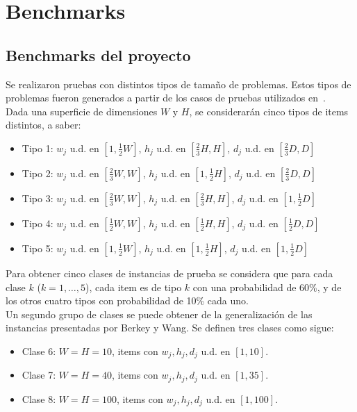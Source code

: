 \section{Benchmarks\label{sec:benchmark}}

\subsection{Benchmarks del proyecto}

Se realizaron pruebas con distintos tipos de tamaño de problemas. Estos tipos de problemas fueron generados a partir de los casos de pruebas utilizados en~\cite{bib:martello00threedimensional}. \\

Dada una superficie de dimensiones $W$ y $H$, se considerarán cinco tipos de items distintos, a saber:

\begin{itemize}
 \item Tipo 1: $w_j$ u.d. en $[1, \frac{1}{2}W]$, $h_j$ u.d. en $[\frac{2}{3}H, H]$, $d_j$ u.d. en $[\frac{2}{3}D, D]$
 \item Tipo 2: $w_j$ u.d. en $[\frac{2}{3}W, W]$, $h_j$ u.d. en $[1, \frac{1}{2}H]$, $d_j$ u.d. en $[\frac{2}{3}D, D]$
 \item Tipo 3: $w_j$ u.d. en $[\frac{2}{3}W, W]$, $h_j$ u.d. en $[\frac{2}{3}H,H]$, $d_j$ u.d. en $[1, \frac{1}{2}D]$
 \item Tipo 4: $w_j$ u.d. en $[\frac{1}{2}W, W]$, $h_j$ u.d. en $[\frac{1}{2}H,H]$, $d_j$ u.d. en $[\frac{1}{2}D,D]$
 \item Tipo 5: $w_j$ u.d. en $[1,\frac{1}{2}W]$, $h_j$ u.d. en $[1,\frac{1}{2}H]$, $d_j$ u.d. en $[1, \frac{1}{2}D]$
\end{itemize}

Para obtener cinco clases de instancias de prueba se considera que para cada clase $k$ ($k=1,\ldots,5$), cada item es de tipo $k$ con una probabilidad de 60\%, y de los otros cuatro tipos con probabilidad de 10\% cada uno. \\

Un segundo grupo de clases se puede obtener de la generalización de las instancias presentadas por Berkey y Wang. Se definen tres clases como sigue:

\begin{itemize}
 \item Clase 6: $W=H=10$, items con $w_j, h_j, d_j$ u.d. en $[1, 10]$.
 \item Clase 7: $W=H=40$, items con $w_j, h_j, d_j$ u.d. en $[1, 35]$.
 \item Clase 8: $W=H=100$, items con $w_j, h_j, d_j$ u.d. en $[1, 100]$.
\end{itemize}

